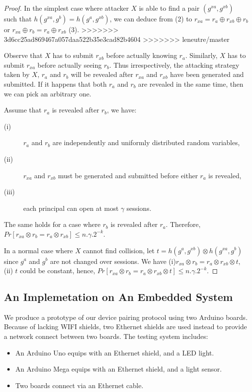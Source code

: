 \begin{enumerate}
\begin{enumerate}
\begin{proof}
In the simplest case where attacker $X$ is able to find a pair $(g^{xa},g^{xb})$ such that $h(g^{xa},g^b) = h(g^a,g^{xb})$, we can deduce from (2) to $r_{xa} = r_a \oplus r_{xb} \oplus r_b$ or $r_{xa} \oplus r_b = r_a \oplus r_{xb}$ (3).
>>>>>>> 3d6cc25ad869467a057daa522b35e3cad82b4604
>>>>>>> leneutre/master

Observe that $X$ has to submit $r_{xb}$ before actually knowing $r_a$. Similarly, $X$ has to submit $r_{xa}$ before actually seeing $r_b$. Thus irrespectively, the attacking strategy taken by $X$, $r_a$ and $r_b$ will be revealed after $r_{xa}$ and $r_{xb}$ have been generated and submitted. If it happens that both $r_a$ and $r_b$ are revealed in the same time, then we can pick an arbitrary one. 

Assume that $r_a$ is revealed after $r_b$, we have:
\begin{description}
 \item [(i)] $r_a$ and $r_b$ are independently and uniformly distributed random variables, 
 \item [(ii)] $r_{xa}$ and $r_{xb}$ must be generated and submitted before either $r_a$ is revealed, 
 \item [(iii)] each principal can open at most $\gamma$ sessions. 
\end{description}
The same holds for a case where $r_b$ is revealed after $r_a$. Therefore, $Pr[r_{xa} \otimes r_b = r_a \otimes r_{xb}] \leq n.\gamma.2^{-k}$.

In a normal case where $X$ cannot find collision, let $t= h(g^a,g^{xb}) \otimes h(g^{xa},g^b)$ since $g^a$ and $g^b$ are not changed over sessions. We have (i)$r_{xa} \otimes r_b = r_a \otimes r_{xb} \otimes t $, (ii) $t$ could be constant, hence, $Pr[r_{xa} \otimes r_b = r_a \otimes r_{xb} \otimes t ] \leq n.\gamma.2^{-k}$. 
\end{proof}

\subsection{An Implemetation on An Embedded System} 

We produce a prototype of our device pairing protocol using two Arduino boards. Because of lacking WIFI shields, two Ethernet shields are used instead to provide a network connect between two boards. The testing system includes:
\begin{itemize}
\item An Arduino Uno equips with an Ethernet shield, and a LED light.
\item An Arduino Mega equips with an Ethernet shield, and a light sensor.
\item Two boards connect via an Ethernet cable. 
\end{itemize}


\end{enumerate}
\end{enumerate}
